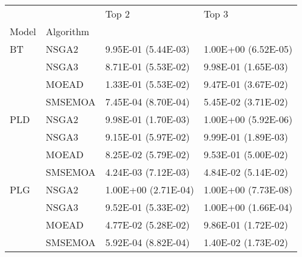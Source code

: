 \begin{tabular}{llll}
\toprule
    &         &                Top 2 &                Top 3 \\
Model & Algorithm &                      &                      \\
\midrule
BT & NSGA2 &  9.95E-01 (5.44E-03) &  1.00E+00 (6.52E-05) \\
    & NSGA3 &  8.71E-01 (5.53E-02) &  9.98E-01 (1.65E-03) \\
    & MOEAD &  1.33E-01 (5.53E-02) &  9.47E-01 (3.67E-02) \\
    & SMSEMOA &  7.45E-04 (8.70E-04) &  5.45E-02 (3.71E-02) \\
PLD & NSGA2 &  9.98E-01 (1.70E-03) &  1.00E+00 (5.92E-06) \\
    & NSGA3 &  9.15E-01 (5.97E-02) &  9.99E-01 (1.89E-03) \\
    & MOEAD &  8.25E-02 (5.79E-02) &  9.53E-01 (5.00E-02) \\
    & SMSEMOA &  4.24E-03 (7.12E-03) &  4.84E-02 (5.14E-02) \\
PLG & NSGA2 &  1.00E+00 (2.71E-04) &  1.00E+00 (7.73E-08) \\
    & NSGA3 &  9.52E-01 (5.33E-02) &  1.00E+00 (1.66E-04) \\
    & MOEAD &  4.77E-02 (5.28E-02) &  9.86E-01 (1.72E-02) \\
    & SMSEMOA &  5.92E-04 (8.82E-04) &  1.40E-02 (1.73E-02) \\
\bottomrule
\end{tabular}
